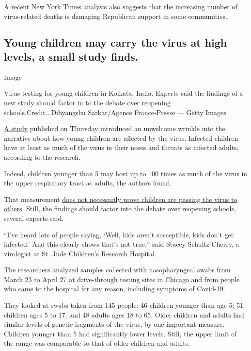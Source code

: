 A
\href{https://www.nytimes.com/2020/07/28/upshot/polling-trump-virus-election.html}{recent
New York Times analysis} also suggests that the increasing number of
virus-related deaths is damaging Republican support in some communities.

\hypertarget{young-children-may-carry-the-virus-at-high-levels-a-small-study-finds}{%
\subsection{Young children may carry the virus at high levels, a small
study
finds.}\label{young-children-may-carry-the-virus-at-high-levels-a-small-study-finds}}

Image

Virus testing for young children in Kolkata, India. Experts said the
findings of a new study should factor in to the debate over reopening
schools.Credit...Dibyangshu Sarkar/Agence France-Presse --- Getty Images

\href{https://jamanetwork.com/journals/jamapediatrics/fullarticle/2768952}{A
study} published on Thursday introduced an unwelcome wrinkle into the
narrative about how young children are affected by the virus. Infected
children have at least as much of the virus in their noses and throats
as infected adults, according to the research.

Indeed, children younger than 5 may host up to 100 times as much of the
virus in the upper respiratory tract as adults, the authors found.

That measurement
\href{https://www.nytimes.com/2020/07/30/health/coronavirus-children.html}{does
not necessarily prove children are passing the virus to others}. Still,
the findings should factor into the debate over reopening schools,
several experts said.

``I've heard lots of people saying, `Well, kids aren't susceptible, kids
don't get infected.' And this clearly shows that's not true,'' said
Stacey Schultz-Cherry, a virologist at St. Jude Children's Research
Hospital.

The researchers analyzed samples collected with nasopharyngeal swabs
from March 23 to April 27 at drive-through testing sites in Chicago and
from people who came to the hospital for any reason, including symptoms
of Covid-19.

They looked at swabs taken from 145 people: 46 children younger than age
5; 51 children ages 5 to 17; and 48 adults ages 18 to 65. Older children
and adults had similar levels of genetic fragments of the virus, by one
important measure. Children younger than 5 had significantly lower
levels. Still, the upper limit of the range was comparable to that of
older children and adults.


